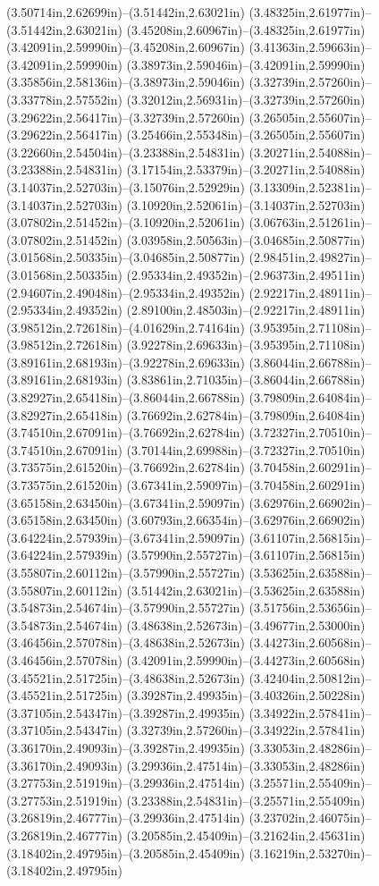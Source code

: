 (3.50714in,2.62699in)--(3.51442in,2.63021in) (3.48325in,2.61977in)--(3.51442in,2.63021in) (3.45208in,2.60967in)--(3.48325in,2.61977in) (3.42091in,2.59990in)--(3.45208in,2.60967in) (3.41363in,2.59663in)--(3.42091in,2.59990in) (3.38973in,2.59046in)--(3.42091in,2.59990in) (3.35856in,2.58136in)--(3.38973in,2.59046in) (3.32739in,2.57260in)--(3.33778in,2.57552in) (3.32012in,2.56931in)--(3.32739in,2.57260in) (3.29622in,2.56417in)--(3.32739in,2.57260in) (3.26505in,2.55607in)--(3.29622in,2.56417in) (3.25466in,2.55348in)--(3.26505in,2.55607in) (3.22660in,2.54504in)--(3.23388in,2.54831in) (3.20271in,2.54088in)--(3.23388in,2.54831in) (3.17154in,2.53379in)--(3.20271in,2.54088in) (3.14037in,2.52703in)--(3.15076in,2.52929in) (3.13309in,2.52381in)--(3.14037in,2.52703in) (3.10920in,2.52061in)--(3.14037in,2.52703in) (3.07802in,2.51452in)--(3.10920in,2.52061in) (3.06763in,2.51261in)--(3.07802in,2.51452in) (3.03958in,2.50563in)--(3.04685in,2.50877in) (3.01568in,2.50335in)--(3.04685in,2.50877in) (2.98451in,2.49827in)--(3.01568in,2.50335in) (2.95334in,2.49352in)--(2.96373in,2.49511in) (2.94607in,2.49048in)--(2.95334in,2.49352in) (2.92217in,2.48911in)--(2.95334in,2.49352in) (2.89100in,2.48503in)--(2.92217in,2.48911in) (3.98512in,2.72618in)--(4.01629in,2.74164in) (3.95395in,2.71108in)--(3.98512in,2.72618in) (3.92278in,2.69633in)--(3.95395in,2.71108in) (3.89161in,2.68193in)--(3.92278in,2.69633in) (3.86044in,2.66788in)--(3.89161in,2.68193in) (3.83861in,2.71035in)--(3.86044in,2.66788in) (3.82927in,2.65418in)--(3.86044in,2.66788in) (3.79809in,2.64084in)--(3.82927in,2.65418in) (3.76692in,2.62784in)--(3.79809in,2.64084in) (3.74510in,2.67091in)--(3.76692in,2.62784in) (3.72327in,2.70510in)--(3.74510in,2.67091in) (3.70144in,2.69988in)--(3.72327in,2.70510in) (3.73575in,2.61520in)--(3.76692in,2.62784in) (3.70458in,2.60291in)--(3.73575in,2.61520in) (3.67341in,2.59097in)--(3.70458in,2.60291in) (3.65158in,2.63450in)--(3.67341in,2.59097in) (3.62976in,2.66902in)--(3.65158in,2.63450in) (3.60793in,2.66354in)--(3.62976in,2.66902in) (3.64224in,2.57939in)--(3.67341in,2.59097in) (3.61107in,2.56815in)--(3.64224in,2.57939in) (3.57990in,2.55727in)--(3.61107in,2.56815in) (3.55807in,2.60112in)--(3.57990in,2.55727in) (3.53625in,2.63588in)--(3.55807in,2.60112in) (3.51442in,2.63021in)--(3.53625in,2.63588in) (3.54873in,2.54674in)--(3.57990in,2.55727in) (3.51756in,2.53656in)--(3.54873in,2.54674in) (3.48638in,2.52673in)--(3.49677in,2.53000in) (3.46456in,2.57078in)--(3.48638in,2.52673in) (3.44273in,2.60568in)--(3.46456in,2.57078in) (3.42091in,2.59990in)--(3.44273in,2.60568in) (3.45521in,2.51725in)--(3.48638in,2.52673in) (3.42404in,2.50812in)--(3.45521in,2.51725in) (3.39287in,2.49935in)--(3.40326in,2.50228in) (3.37105in,2.54347in)--(3.39287in,2.49935in) (3.34922in,2.57841in)--(3.37105in,2.54347in) (3.32739in,2.57260in)--(3.34922in,2.57841in) (3.36170in,2.49093in)--(3.39287in,2.49935in) (3.33053in,2.48286in)--(3.36170in,2.49093in) (3.29936in,2.47514in)--(3.33053in,2.48286in) (3.27753in,2.51919in)--(3.29936in,2.47514in) (3.25571in,2.55409in)--(3.27753in,2.51919in) (3.23388in,2.54831in)--(3.25571in,2.55409in) (3.26819in,2.46777in)--(3.29936in,2.47514in) (3.23702in,2.46075in)--(3.26819in,2.46777in) (3.20585in,2.45409in)--(3.21624in,2.45631in) (3.18402in,2.49795in)--(3.20585in,2.45409in) (3.16219in,2.53270in)--(3.18402in,2.49795in) 